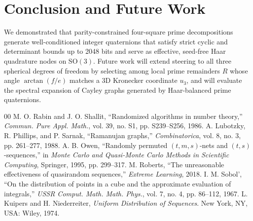 \documentclass[conference]{IEEEtran}
\begin{document}
\section{Conclusion and Future Work}
We demonstrated that parity-constrained four-square prime decompositions generate well-conditioned integer quaternions that satisfy strict cyclic and determinant bounds up to 2048 bits and serve as effective, seed-free Haar quadrature nodes on $\mathrm{SO}(3)$. Future work will extend steering to all three spherical degrees of freedom by selecting among local prime remainders $R$ whose angle $\arctan(f/e)$ matches a 3D Kronecker coordinate $u_3$, and will evaluate the spectral expansion of Cayley graphs generated by Haar-balanced prime quaternions.

\begin{thebibliography}{00}
 M. O. Rabin and J. O. Shallit, ``Randomized algorithms in number theory,'' \emph{Commun. Pure Appl. Math.}, vol. 39, no. S1, pp. S239--S256, 1986.
 A. Lubotzky, R. Phillips, and P. Sarnak, ``Ramanujan graphs,'' \emph{Combinatorica}, vol. 8, no. 3, pp. 261--277, 1988.
 A. B. Owen, ``Randomly permuted $(t,m,s)$-nets and $(t,s)$-sequences,'' in \emph{Monte Carlo and Quasi-Monte Carlo Methods in Scientific Computing}, Springer, 1995, pp. 299--317.
 M. Roberts, ``The unreasonable effectiveness of quasirandom sequences,'' \emph{Extreme Learning}, 2018.
 I. M. Sobol', ``On the distribution of points in a cube and the approximate evaluation of integrals,'' \emph{USSR Comput. Math. Math. Phys.}, vol. 7, no. 4, pp. 86--112, 1967.
 L. Kuipers and H. Niederreiter, \emph{Uniform Distribution of Sequences}. New York, NY, USA: Wiley, 1974.
\end{thebibliography}
\end{document}

